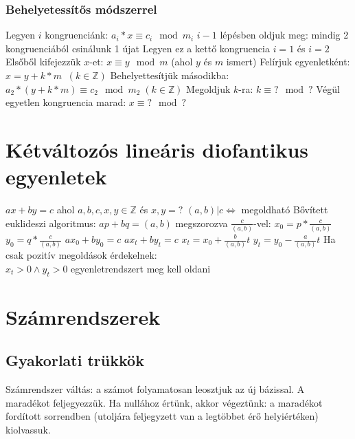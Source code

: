 \documentclass[12pt,a4paper]{article}
\begin{document}
\subsubsection{Behelyetessítős módszerrel}

\begin{outline}
	\1 Legyen $i$ kongruenciánk: $a_i*x \equiv c_i \mod m_i$
	\1 $i-1$ lépésben oldjuk meg: mindig 2 kongruenciából csinálunk 1 újat
		\2 Legyen ez a kettő kongruencia $i=1$ és $i=2$
		\2 Elsőből kifejezzük $x$-et: $x \equiv y \mod m$ (ahol $y$ és $m$ ismert)
		\2 Felírjuk egyenletként: $x = y + k*m \;\; (k \in \mathbb{Z})$
		\2 Behelyettesítjük másodikba: $a_2 * (y + k*m) \equiv c_2 \mod m_2 \; (k \in \mathbb{Z})$
		\2 Megoldjuk $k$-ra: $k \equiv ? \mod ?$
	\1 Végül egyetlen kongruencia marad: $x \equiv ? \mod ?$
\end{outline}

\pagebreak

\section{Kétváltozós lineáris diofantikus egyenletek}

\begin{outline}
	\1 $ax+by=c$ ahol $a,b,c,x,y \in \mathbb{Z}$ és $x,y=?$
	\1 $(a,b)|c \Leftrightarrow$ megoldható
	\1 Bővített euklideszi algoritmus: $ap+bq=(a,b)$
		\2 megszorozva $\frac{c}{(a,b)}$-vel:
		\2 $x_0=p*\frac{c}{(a,b)}$
		\2 $y_0=q*\frac{c}{(a,b)}$
		\2 $ax_0+by_0=c$
	\1 $ax_t+by_t=c$
		\2 $x_t=x_0+\frac{b}{(a,b)}t$
		\2 $y_t=y_0-\frac{a}{(a,b)}t$
	\1 Ha csak pozitív megoldások érdekelnek:\\
	$x_t>0 \wedge y_t>0$ egyenletrendszert meg kell oldani
\end{outline}

\pagebreak

\section{Számrendszerek}

\subsection{Gyakorlati trükkök}

\begin{outline}
	\1 Számrendszer váltás: a számot folyamatosan leosztjuk az új bázissal. A maradékot feljegyezzük.
	Ha nullához értünk, akkor végeztünk: a maradékot fordított sorrendben
	(utoljára feljegyzett van a legtöbbet érő helyiértéken) kiolvassuk.
\end{outline}
\end{document}
